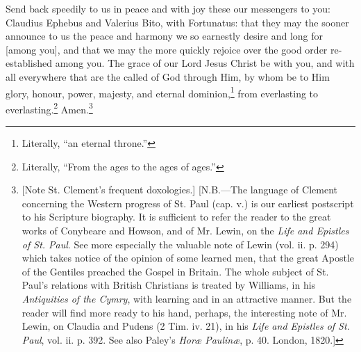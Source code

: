 
Send back speedily to us in peace and with joy these our messengers to you: Claudius Ephebus and Valerius Bito, with Fortunatus: that they may the sooner announce to us the peace and harmony we so earnestly desire and long for [among you], and that we may the more quickly rejoice over the good order re-established among you. The grace of our Lord Jesus Christ be with you, and with all everywhere that are the called of God through Him, by whom be to Him glory, honour, power, majesty, and eternal dominion,\footnote{Literally, “an eternal throne.”} from everlasting to everlasting.\footnote{Literally, “From the ages to the ages of ages.”} Amen.\footnote{[Note St. Clement’s frequent doxologies.] [N.B.—The language of Clement concerning the Western progress of St. Paul (cap. v.) is our earliest postscript to his Scripture biography. It is sufficient to refer the reader to the great works of Conybeare and Howson, and of Mr. Lewin, on the \emph{Life and Epistles of St. Paul}. See more especially the valuable note of Lewin (vol. ii. p. 294) which takes notice of the opinion of some learned men, that the great Apostle of the Gentiles preached the Gospel in Britain. The whole subject of St. Paul’s relations with British Christians is treated by Williams, in his \emph{Antiquities of the Cymry}, with learning and in an attractive manner. But the reader will find more ready to his hand, perhaps, the interesting note of Mr. Lewin, on Claudia and Pudens (2 Tim. iv. 21), in his \emph{Life and Epistles of St. Paul}, vol. ii. p. 392. See also Paley’s \emph{Horæ Paulinæ}, p. 40. London, 1820.]}
